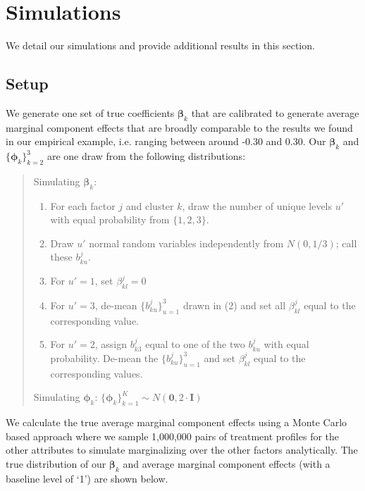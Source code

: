 \section{Simulations}
\label{sec:app_simulations}

We detail our simulations and provide additional results in this
section.

\subsection{Setup}

We generate one set of true coefficients $\bm{\beta}_k$ that
are calibrated to generate average marginal component effects that are broadly
comparable to the results we found in our empirical example,
i.e. ranging between around -0.30 and 0.30. Our $\bm{\beta}_k$ and
$\{\bm{\phi}_k\}_{k=2}^3$ are one draw from the following
distributions: 
\begin{quote}
	Simulating $\bm{\beta}_k$:
	\begin{enumerate}
		\item For each factor $j$ and cluster $k$, draw the number of unique levels $u'$ with equal probability from $\{1, 2, 3\}$. 
		\item Draw $u'$ normal random variables independently from $N(0, 1/3)$; call these $b^j_{ku}$.
		\item For $u' = 1$, set $\beta^j_{kl} = 0$
		\item For $u' = 3$, de-mean $\{b^j_{ku}\}_{u=1}^3$ drawn in (2) and set all $\beta^j_{kl}$ equal to the corresponding value.
		\item For $u' = 2$, assign $b^j_{k3}$ equal to one of the two $b^j_{ku}$ with equal probability. De-mean the $\{b^j_{ku}\}_{u=1}^3$ and set $\beta^j_{kl}$ equal to the corresponding values.
	\end{enumerate}
	Simulating $\bm{\phi}_k$: $\{\bm{\phi}_k\}_{k=1}^K \sim N(\bm{0}, 2 \cdot \bm{I})$
\end{quote}

We calculate the true average marginal component effects using a Monte Carlo based approach where we sample 1,000,000 pairs of treatment profiles for the other attributes to simulate marginalizing over the other factors analytically. The true distribution of our $\bm{\beta}_k$ and average marginal component effects (with a baseline level of `1') are shown below.

